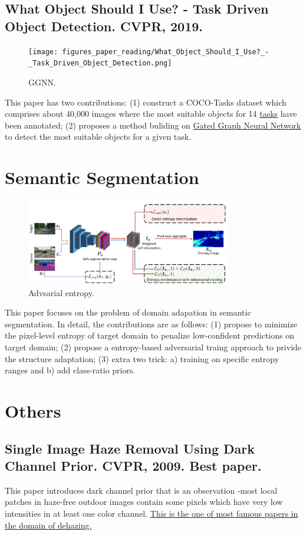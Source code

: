 \documentclass[10pt,onecolumn]{book}
\begin{document}
\section{What Object Should I Use? - Task Driven Object Detection. CVPR, 2019.}
\begin{figure}[h]
\centering
\texttt{[image: figures\_paper\_reading/What\_Object\_Should\_I\_Use?\_-\_Task\_Driven\_Object\_Detection.png]}
\caption{GGNN.}
\label{fig}
\end{figure}

This paper has two contributions:
(1) construct a COCO-Tasks dataset which comprises about 40,000 images where the most suitable objects for 14 \uline{tasks} have been annotated;
(2) proposes a method buliding on \uline{Gated Graph Neural Network} to detect the most suitable objects for a given task. 

\chapter{Semantic Segmentation}
\begin{figure}[h]
\centering
\includegraphics[width=0.8\textwidth]{figures_paper_reading/ADVENT_Adversarial_Entropy_Minimization_for_Domain_Adaptation_in_Semantic_Segmentation_CVPR2019.png}
\caption{Advsarial entropy.}
\label{fig}
\end{figure}
This paper focuses on the problem of domain adapation in semantic segmentation. In detail, the contributions are as follows: (1) propose to minimize the pixel-level entropy of target domain to penalize low-confident predictions on target domain; (2) propose a entropy-based adversarial traing approach to privide the structure adaptation; (3) extra two trick: a) training on specific entropy ranges and b) add class-ratio priors.

\chapter{Others}
\section{Single Image Haze Removal Using Dark Channel Prior. CVPR, 2009. Best paper.}
This paper introduces dark channel prior that is an observation -most local patches in haze-free outdoor images contain some pixels which have very low intensities in at least one color channel. \uline{This is the one of most famous papers in the domain of dehazing.} 
\end{document}
